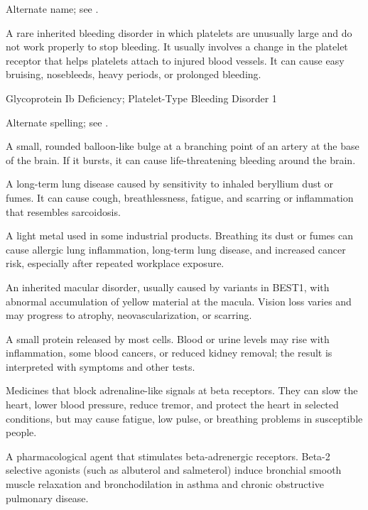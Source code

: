  Alternate name; see .

 A rare inherited bleeding disorder in
which platelets are unusually large and do not work properly to stop
bleeding. It usually involves a change in the platelet receptor that helps
platelets attach to injured blood vessels. It can cause easy bruising,
nosebleeds, heavy periods, or prolonged bleeding.

\synonyms
Glycoprotein Ib Deficiency; Platelet-Type Bleeding Disorder 1

 Alternate spelling; see .

 A small, rounded balloon-like bulge at a branching point of an artery at the base of the brain. If it bursts, it can cause life-threatening bleeding around the brain.

 A long-term lung disease caused by sensitivity to inhaled beryllium dust or fumes. It can cause cough, breathlessness, fatigue, and scarring or inflammation that resembles sarcoidosis.

 A light metal used in some industrial products. Breathing its dust or fumes can cause allergic lung inflammation, long-term lung disease, and increased cancer risk, especially after repeated workplace exposure.

 An inherited macular disorder, usually caused by variants in BEST1, with abnormal accumulation of yellow material at the macula. Vision loss varies and may progress to atrophy, neovascularization, or scarring.

 A small protein released by most cells. Blood or urine levels may rise with inflammation, some blood cancers, or reduced kidney removal; the result is interpreted with symptoms and other tests.

 Medicines that block adrenaline-like signals at beta receptors. They can slow the heart, lower blood pressure, reduce tremor, and protect the heart in selected conditions, but may cause fatigue, low pulse, or breathing problems in susceptible people.

 A pharmacological agent that stimulates beta-adrenergic receptors. Beta-2 selective agonists (such as albuterol and salmeterol) induce bronchial smooth muscle relaxation and bronchodilation in asthma and chronic obstructive pulmonary disease.

